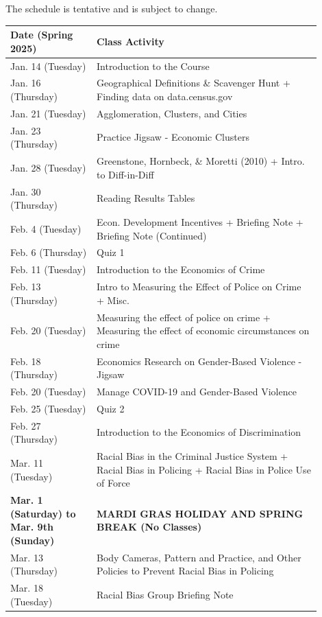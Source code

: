 \documentclass[11pt,letterpaper,final]{article}
\begin{document}
The schedule is tentative and is subject to change. 

\begin{table}[H]
\centering
{}
\begin{tabular}{@{}p{0.25\linewidth}p{0.65\linewidth}@{}}
\toprule
\textbf{Date (Spring 2025)} & \textbf{Class Activity} \\
\midrule
Jan. 14 (Tuesday) & Introduction to the Course \\
Jan. 16 (Thursday) & Geographical Definitions \& Scavenger Hunt + Finding data on data.census.gov \\
Jan. 21 (Tuesday) & Agglomeration, Clusters, and Cities \\
Jan. 23 (Thursday) & Practice Jigsaw - Economic Clusters \\
Jan. 28 (Tuesday) & Greenstone, Hornbeck, \& Moretti (2010) + Intro. to Diff-in-Diff \\
Jan. 30 (Thursday) & Reading Results Tables \\
Feb. 4 (Tuesday) & Econ. Development Incentives + Briefing Note + Briefing Note (Continued) \\
Feb. 6 (Thursday) & Quiz 1 \\
Feb. 11 (Tuesday) & Introduction to the Economics of Crime \\
Feb. 13 (Thursday) & Intro to Measuring the Effect of Police on Crime + Misc. \\
Feb. 20 (Tuesday) & Measuring the effect of police on crime + Measuring the effect of economic circumstances on crime \\
Feb. 18 (Thursday) & Economics Research on Gender-Based Violence - Jigsaw \\
Feb. 20 (Tuesday) & Manage COVID-19 and Gender-Based Violence \\
Feb. 25 (Tuesday) & Quiz 2 \\
Feb. 27 (Thursday) & Introduction to the Economics of Discrimination \\
Mar. 11 (Tuesday) & Racial Bias in the Criminal Justice System + Racial Bias in Policing + Racial Bias in Police Use of Force \\
\textbf{Mar. 1 (Saturday) to Mar. 9th (Sunday)} & \textbf{MARDI GRAS HOLIDAY AND SPRING BREAK (No Classes)} \\
Mar. 13 (Thursday) & Body Cameras, Pattern and Practice, and Other Policies to Prevent Racial Bias in Policing \\
Mar. 18 (Tuesday) & Racial Bias Group Briefing Note \\

\end{tabular}
\end{table}
\end{document}
